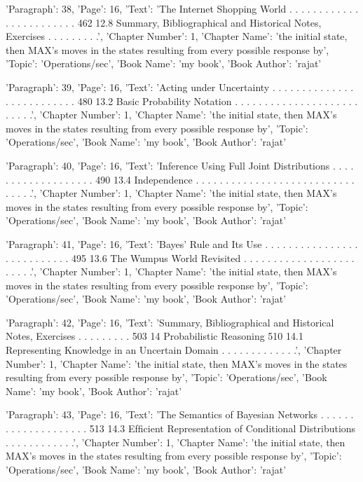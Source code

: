 {'Paragraph': 38, 'Page': 16, 'Text': 'The Internet Shopping World . . . . . . . . . . . . . . . . . . . . . . . . 462 12.8 Summary, Bibliographical and Historical Notes, Exercises . . . . . . . . .', 'Chapter Number': 1, 'Chapter Name': 'the initial state, then MAX’s moves in the states resulting from every possible response by', 'Topic': 'Operations/sec', 'Book Name': 'my book', 'Book Author': 'rajat'}

{'Paragraph': 39, 'Page': 16, 'Text': 'Acting under Uncertainty . . . . . . . . . . . . . . . . . . . . . . . . . . 480 13.2 Basic Probability Notation . . . . . . . . . . . . . . . . . . . . . . . . . .', 'Chapter Number': 1, 'Chapter Name': 'the initial state, then MAX’s moves in the states resulting from every possible response by', 'Topic': 'Operations/sec', 'Book Name': 'my book', 'Book Author': 'rajat'}

{'Paragraph': 40, 'Page': 16, 'Text': 'Inference Using Full Joint Distributions . . . . . . . . . . . . . . . . . . . 490 13.4 Independence . . . . . . . . . . . . . . . . . . . . . . . . . . . . . . . .', 'Chapter Number': 1, 'Chapter Name': 'the initial state, then MAX’s moves in the states resulting from every possible response by', 'Topic': 'Operations/sec', 'Book Name': 'my book', 'Book Author': 'rajat'}

{'Paragraph': 41, 'Page': 16, 'Text': 'Bayes’ Rule and Its Use . . . . . . . . . . . . . . . . . . . . . . . . . . . 495 13.6 The Wumpus World Revisited . . . . . . . . . . . . . . . . . . . . . . . .', 'Chapter Number': 1, 'Chapter Name': 'the initial state, then MAX’s moves in the states resulting from every possible response by', 'Topic': 'Operations/sec', 'Book Name': 'my book', 'Book Author': 'rajat'}

{'Paragraph': 42, 'Page': 16, 'Text': 'Summary, Bibliographical and Historical Notes, Exercises . . . . . . . . . 503 14 Probabilistic Reasoning 510 14.1 Representing Knowledge in an Uncertain Domain . . . . . . . . . . . . .', 'Chapter Number': 1, 'Chapter Name': 'the initial state, then MAX’s moves in the states resulting from every possible response by', 'Topic': 'Operations/sec', 'Book Name': 'my book', 'Book Author': 'rajat'}

{'Paragraph': 43, 'Page': 16, 'Text': 'The Semantics of Bayesian Networks . . . . . . . . . . . . . . . . . . . . 513 14.3 Efﬁcient Representation of Conditional Distributions . . . . . . . . . . . .', 'Chapter Number': 1, 'Chapter Name': 'the initial state, then MAX’s moves in the states resulting from every possible response by', 'Topic': 'Operations/sec', 'Book Name': 'my book', 'Book Author': 'rajat'}

